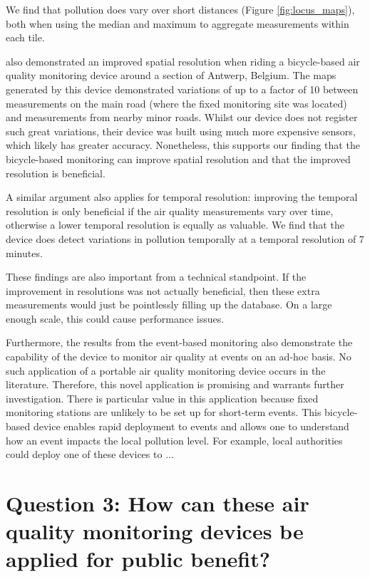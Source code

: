 \documentclass[11pt]{report}
\begin{document}
We find that pollution does vary over short distances (Figure \ref{fig:locus_maps}), both when using the median and maximum to aggregate measurements within each tile.

\cite{Elen2013aeroflex} also demonstrated an improved spatial resolution when riding a bicycle-based air quality monitoring device around a section of Antwerp, Belgium. The maps generated by this device demonstrated variations of up to a factor of 10 between measurements on the main road (where the fixed monitoring site was located) and measurements from nearby minor roads. Whilst our device does not register such great variations, their device was built using much more expensive sensors, which likely has greater accuracy. Nonetheless, this supports our finding that the bicycle-based monitoring can improve spatial resolution and that the improved resolution is beneficial.

A similar argument also applies for temporal resolution: improving the temporal resolution is only beneficial if the air quality measurements vary over time, otherwise a lower temporal resolution is equally as valuable. We find that the device does detect variations in pollution temporally at a temporal resolution of 7 minutes.

These findings are also important from a technical standpoint. If the improvement in resolutions was not actually beneficial, then these extra measurements would just be pointlessly filling up the database. On a large enough scale, this could cause performance issues.

Furthermore, the results from the event-based monitoring also demonstrate the capability of the device to monitor air quality at events on an ad-hoc basis. No such application of a portable air quality monitoring device occurs in the literature. Therefore, this novel application is promising and warrants further investigation. There is particular value in this application because fixed monitoring stations are unlikely to be set up for short-term events. This bicycle-based device enables rapid deployment to events and allows one to understand how an event impacts the local pollution level. For example, local authorities could deploy one of these devices to ...


\chapter{Question 3: How can these air quality monitoring devices be applied for public benefit?} \label{chap:q3}
\end{document}
